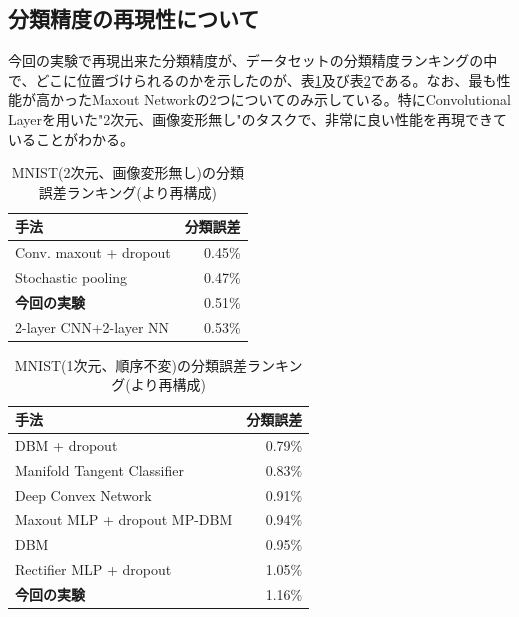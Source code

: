 \subsection{分類精度の再現性について}
今回の実験で再現出来た分類精度が、データセットの分類精度ランキングの中で、どこに位置づけられるのかを示したのが、表\ref{c5_mnist2_result}及び表\ref{c5_mnist1_result}である。なお、最も性能が高かったMaxout Networkの2つについてのみ示している。特にConvolutional Layerを用いた"2次元、画像変形無し"のタスクで、非常に良い性能を再現できていることがわかる。
\begin{table}[tdp]
\caption{MNIST(2次元、画像変形無し)の分類誤差ランキング(\cite{goodfellow2013maxout}より再構成)}
\begin{center}
    \begin{tabular}{| l | r |}\hline
    手法 & 分類誤差 \\ \hline
    Conv. maxout + dropout & 0.45\% \\ \hline
    Stochastic pooling \cite{zeiler2013stochastic} & 0.47\% \\ \hline
    \textbf{今回の実験} & 0.51\% \\ \hline
2-layer CNN+2-layer NN \cite{jarrett2009what} & 0.53\% \\ \hline
    \end{tabular}%
    \end{center}
\label{c5_mnist2_result}
\end{table}%

\begin{table}[tdp]
\caption{MNIST(1次元、順序不変)の分類誤差ランキング(\cite{goodfellow2013maxout}より再構成)}
\begin{center}
    \begin{tabular}{| l | r |}\hline
    手法 & 分類誤差 \\ \hline
DBM + dropout \cite{hinton2012improving} & 0.79\% \\ \hline
Manifold Tangent Classifier \cite{rifai2011the-manifold} & 0.83\% \\ \hline
Deep Convex Network \cite{yu2011deep} & 0.91\% \\ \hline
Maxout MLP + dropout MP-DBM\cite{goodfellow2012joint} & 0.94\% \\ \hline
DBM \cite{salakhutdinov2009deep} & 0.95\% \\ \hline
Rectifier MLP + dropout \cite{srivastava2013improving} & 1.05\% \\ \hline
\textbf{今回の実験} & 1.16\% \\ \hline
    \end{tabular}%
    \end{center}
\label{c5_mnist1_result}
\end{table}%

